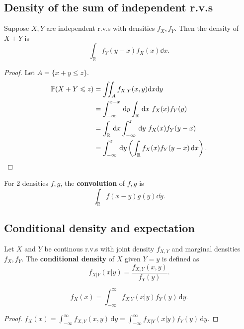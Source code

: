 \subsection{Density of the sum of independent r.v.s}
\begin{proposition}\label{prop:3.10}
    Suppose $ X,Y $ are independent r.v.s with densities $ f_X,f_Y $. Then the density of $ X+Y $ is 
    \[
        \int_\mathbb{R} f_Y(y-x)f_X(x)\dd x .
    \]
\end{proposition}
\begin{proof}
    Let $A=\{x+y\le z\}$.
    \begin{align*}
        \mathbb{P}(X+Y\leqslant z)&=\iint_A f_{X,Y}(x,y)\dd x\dd y\\ 
        &= \int_{-\infty}^{z-x} \,\mathrm{d}y \int_{\mathbb{R}} \,\mathrm{d}x\ f_X(x)f_Y(y)\\ 
        &= \int_{\mathbb{R}} \,\mathrm{d}x \int_{-\infty}^{z} \,\mathrm{d}y\ f_X(x)f_Y(y-x)\\ 
        &= \int_{-\infty}^{z} \,\mathrm{d}y \left( \int_{\mathbb{R}} f_X(x)f_Y(y-x)\,\mathrm{d}x \right).\qedhere
    \end{align*}
\end{proof}

\begin{definition}
    For 2 densities $f,g$, the \textbf{convolution} of $f,g$ is 
    \[
        \int_\mathbb{R} f(x-y)g(y)\dd y.
    \]
\end{definition}

\subsection{Conditional density and expectation}
\begin{definition}
    Let $X$ and $Y$ be continous r.v.s with joint density $ f_{X,Y} $ and marginal densities $ f_X,f_Y $. The \textbf{conditional density} of $X$ given $ Y=y $ is defined as 
    \[
        f_{X|Y}(x|y) = \frac{f_{X,Y}(x,y)}{f_Y(y)}.
    \]
\end{definition}
\begin{proposition}
    \[
        f_X(x) = \int_{-\infty}^{\infty} f_{X|Y}(x|y)f_Y(y) \,\mathrm{d}y.
    \]
\end{proposition}
\begin{proof}
    $ f_X(x) = \int_{-\infty}^{\infty} f_{X,Y}(x,y) \,\mathrm{d}y = \int_{-\infty}^{\infty} f_{X|Y}(x|y)f_Y(y) \,\mathrm{d}y. $
\end{proof}

